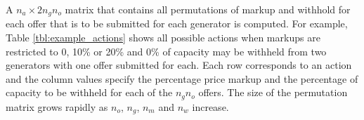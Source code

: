 A $n_a \times 2n_gn_o$ matrix that contains all permutations of markup and
withhold for each offer that is to be submitted for each generator is computed.
For example, Table \ref{tbl:example_actions} shows all possible actions when
markups are restricted to 0, 10\% or 20\% and 0\% of capacity may be withheld
from two generators with one offer submitted for each.  Each row corresponds to
an action and the column values specify the percentage price markup and the
percentage of capacity to be withheld for each of the $n_gn_o$ offers.  The
size of the permutation matrix grows rapidly as $n_o$, $n_g$, $n_m$ and $n_w$
increase.

%

